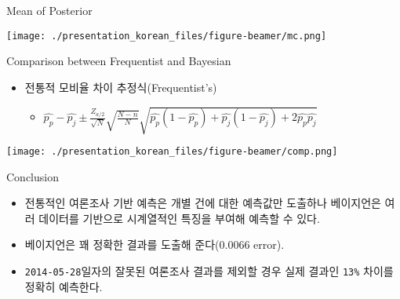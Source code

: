 \documentclass[ignorenonframetext,]{beamer}
\makeatletter
\def\maxwidth{\ifdim\Gin@nat@width>\linewidth\linewidth\else\Gin@nat@width\fi}
\def\maxheight{\ifdim\Gin@nat@height>\textheight0.8\textheight\else\Gin@nat@height\fi}
\renewcommand{\includegraphics}[2][]{%
    \Oldincludegraphics[#1,width=\maxwidth,height=\maxheight,keepaspectratio]{#2}}
\makeatother
\begin{document}
\begin{frame}{Mean of Posterior}

\texttt{[image: ./presentation\_korean\_files/figure-beamer/mc.png]}

\end{frame}

\begin{frame}{Comparison between Frequentist and Bayesian}

\begin{itemize}
\itemsep1pt\parskip0pt
\item
  전통적 모비율 차이 추정식(Frequentist's)

  \begin{itemize}
  \itemsep1pt\parskip0pt
  \item
    $\hat{p_p} - \hat{p_j} \pm \frac{Z_{a/2}}{\sqrt{N}}\sqrt{\frac{N - n}{N}}\sqrt{\hat{p_p}(1 - \hat{p_p}) + \hat{p_j}(1 - \hat{p_j}) + 2\hat{p_p}\hat{p_j}}$
  \end{itemize}
\end{itemize}

\texttt{[image: ./presentation\_korean\_files/figure-beamer/comp.png]}

\end{frame}

\begin{frame}{Conclusion}

\begin{itemize}
\itemsep1pt\parskip0pt
\item
  전통적인 여론조사 기반 예측은 개별 건에 대한 예측값만 도출하나
  베이지언은 여러 데이터를 기반으로 시계열적인 특징을 부여해 예측할 수
  있다.
\item
  베이지언은 꽤 정확한 결과를 도출해 준다(0.0066 error).
\item
  \texttt{2014-05-28}일자의 잘못된 여론조사 결과를 제외할 경우 실제
  결과인 \texttt{13\%} 차이를 정확히 예측한다.
\end{itemize}

\end{frame}
\end{document}
